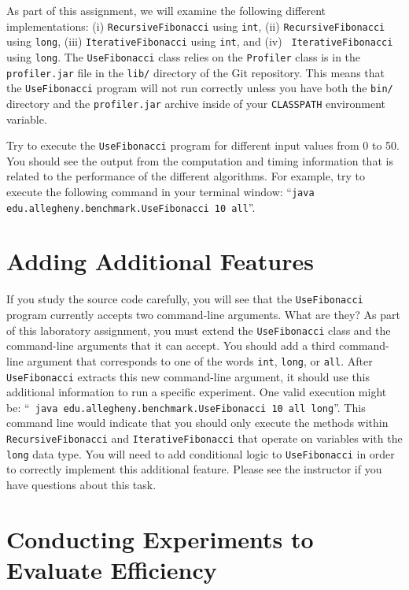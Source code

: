 \begin{sloppypar}
As part of this assignment, we will examine the following different implementations: (i) {\tt RecursiveFibonacci} using
{\tt int}, (ii) {\tt RecursiveFibonacci} using {\tt long}, (iii) {\tt IterativeFibonacci} using {\tt int}, and (iv) {\tt
  IterativeFibonacci} using {\tt long}. The {\tt UseFibonacci} class relies on the {\tt Profiler} class is in the {\tt
  profiler.jar} file in the {\tt lib/} directory of the Git repository.  This means that the {\tt UseFibonacci} program
will not run correctly unless you have both the {\tt bin/} directory and the {\tt profiler.jar} archive inside of your
{\tt CLASSPATH} environment variable.
\end{sloppypar}

Try to execute the {\tt UseFibonacci} program for different input values from 0 to 50. You should see the output from
the computation and timing information that is related to the performance of the different algorithms. For example, try
to execute the following command in your terminal window: ``{\tt java edu.allegheny.benchmark.UseFibonacci 10 all}''.

\section*{Adding Additional Features}

  If you study the source code carefully, you will see that the {\tt UseFibonacci} program currently accepts two
  command-line arguments. What are they? As part of this laboratory assignment, you must extend the {\tt UseFibonacci}
  class and the command-line arguments that it can accept. You should add a third command-line argument that corresponds
  to one of the words {\tt int}, {\tt long}, or {\tt all}. After {\tt UseFibonacci} extracts this new command-line
  argument, it should use this additional information to run a specific experiment. One valid execution might be: ``{\tt
    java edu.allegheny.benchmark.Use\-Fibonacci 10 all long}''. This command line would indicate that you should only
  execute the methods within {\tt RecursiveFibonacci} and {\tt IterativeFibonacci} that operate on variables with the
  {\tt long} data type.  You will need to add conditional logic to {\tt UseFibonacci} in order to correctly
  implement this additional feature. Please see the instructor if you have questions about this task.

\section*{Conducting Experiments to Evaluate Efficiency}

